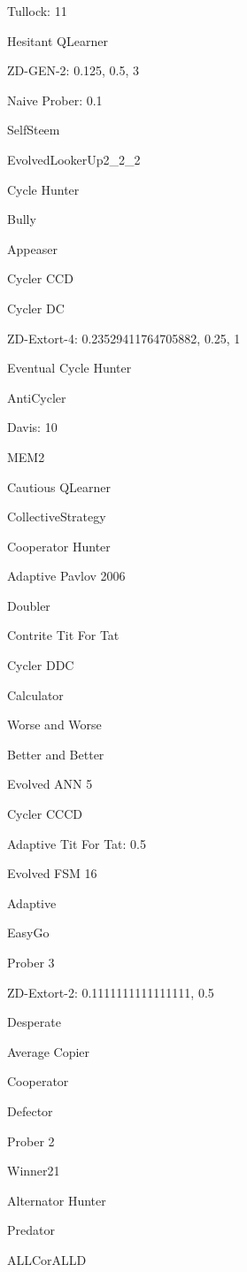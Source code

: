 \item Tullock: 11
\item Hesitant QLearner
\item ZD-GEN-2: 0.125, 0.5, 3
\item Naive Prober: 0.1
\item SelfSteem
\item EvolvedLookerUp2\_2\_2
\item Cycle Hunter
\item Bully
\item Appeaser
\item Cycler CCD
\item Cycler DC
\item ZD-Extort-4: 0.23529411764705882, 0.25, 1
\item Eventual Cycle Hunter
\item AntiCycler
\item Davis: 10
\item MEM2
\item Cautious QLearner
\item CollectiveStrategy
\item Cooperator Hunter
\item Adaptive Pavlov 2006
\item Doubler
\item Contrite Tit For Tat
\item Cycler DDC
\item Calculator
\item Worse and Worse
\item Better and Better
\item Evolved ANN 5
\item Cycler CCCD
\item Adaptive Tit For Tat: 0.5
\item Evolved FSM 16
\item Adaptive
\item EasyGo
\item Prober 3
\item ZD-Extort-2: 0.1111111111111111, 0.5
\item Desperate
\item Average Copier
\item Cooperator
\item Defector
\item Prober 2
\item Winner21
\item Alternator Hunter
\item Predator
\item ALLCorALLD
